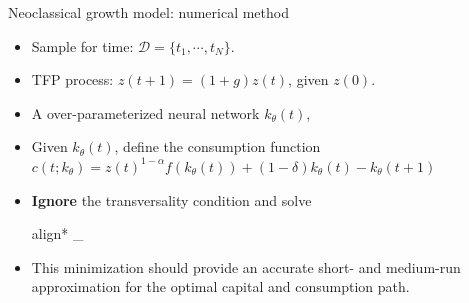 \documentclass[aspectratio=169,10pt]{beamer}
\newcommand{\emphcolor}[1]{\textbf{\textcolor{emphcolorval}{#1}}}
\begin{document}
\begin{frame}{Neoclassical growth model: numerical method}
	\begin{itemize}
		\item Sample for time:  $\mathcal{D} = \{t_1,\cdots,t_N\}$.
		\vspace{0.05in}
		\item TFP process: $z(t+1) = (1+g)z(t)$, given $z(0)$.
		\item A over-parameterized neural network $k_\theta(t)$,
		\vspace{0.05in}
		\item Given $k_\theta(t)$, define the consumption function $c(t;k_{\theta}) = z(t)^{1-\alpha}f(k_{\theta}(t)) +(1-\delta)k_{\theta}(t)-k_{\theta}(t+1)
		$
		\vspace{0.05in}
		 \item \emphcolor{Ignore} the transversality condition and solve
			\hspace*{-5mm}
		\begin{empheq}[box=\tcbhighmath]{align*}
			\hspace*{-4mm}
			\min_{\theta \in \Theta}
		\end{empheq}
		\item This minimization should provide an accurate short- and medium-run approximation for the optimal capital and consumption path.
	\end{itemize}
\end{frame}
\end{document}
